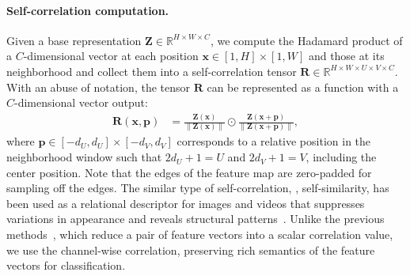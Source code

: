 \documentclass[10pt,twocolumn,letterpaper]{article}
\newcommand{\Real}{\mathbb{R}}
\newcommand{\bp}{\mathbf{p}}
\newcommand{\bx}{\mathbf{x}}
\newcommand{\bZ}{\mathbf{Z}}
\newcommand{\bR}{\mathbf{R}}
\begin{document}
\paragraph{Self-correlation computation.}
Given a base representation $\bZ \in \mathbb{R}^{H \times W \times C}$, we compute the Hadamard product of a $C$-dimensional vector at each position $\bx \in [1,H] \times [1,W]$ and those at its neighborhood and collect them into a self-correlation tensor $\bR \in \Real^{H \times W \times U \times V \times C}$. With an abuse of notation, the tensor $\bR$ can be represented as a function with a $C$-dimensional vector output:
\begin{align}
    \bR(\bx, \bp) &= \frac{\bZ(\bx)}{\lVert \bZ(\bx) \rVert} \odot \frac{\bZ(\bx + \bp)}{\lVert \bZ(\bx + \bp) \rVert}, 
    \label{eq:self_computation}
\end{align}
where $\bp \in [-d_U, d_U] \times [-d_V, d_V]$ corresponds to a relative position in the neighborhood window such that $2d_U + 1 = U$ and $2d_V + 1 = V$, including the center position.
Note that the edges of the feature map are zero-padded for sampling off the edges.
The similar type of self-correlation, \ie, self-similarity, has been used as a relational descriptor for images and videos that suppresses variations in appearance and reveals structural patterns~\cite{shechtman2007matching}.
Unlike the previous methods~\cite{shechtman2007matching, deselaers2010global, junejo2008cross}, which reduce a pair of feature vectors into a scalar correlation value, we use the channel-wise correlation, preserving rich semantics of the feature vectors for classification.
\end{document}
